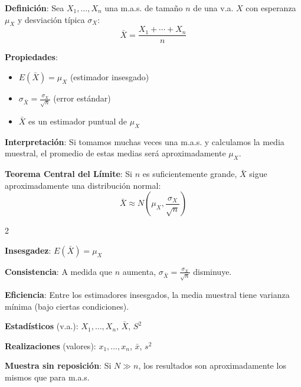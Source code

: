 \documentclass[10pt,a4paper]{article}
\begin{document}
\begin{tcolorbox}[title=Media Muestral]
    \textbf{Definición}: Sea $X_1, \ldots, X_n$ una m.a.s. de tamaño $n$ de una v.a. $X$ con esperanza $\mu_X$ y desviación típica $\sigma_X$:
    \[
        \bar{X} = \frac{X_1 + \cdots + X_n}{n}
    \]
    
    \textbf{Propiedades}:
    \begin{itemize}
        \item $E(\bar{X}) = \mu_X$ (estimador insesgado)
        \item $\sigma_{\bar{X}} = \frac{\sigma_X}{\sqrt{n}}$ (error estándar)
        \item $\bar{X}$ es un estimador puntual de $\mu_X$
    \end{itemize}
    
    \textbf{Interpretación}: Si tomamos muchas veces una m.a.s. y calculamos la media muestral, el promedio de estas medias será aproximadamente $\mu_X$.
    
    \textbf{Teorema Central del Límite}: Si $n$ es suficientemente grande, $\bar{X}$ sigue aproximadamente una distribución normal:
    \[
        \bar{X} \approx N\left(\mu_X, \frac{\sigma_X}{\sqrt{n}}\right)
    \]
\end{tcolorbox}

\begin{multicols}{2}
    \begin{tcolorbox}[title=Propiedades de la Media Muestral, equal height group=EST2]
        \textbf{Insesgadez}: $E(\bar{X}) = \mu_X$
        
        \textbf{Consistencia}: A medida que $n$ aumenta, $\sigma_{\bar{X}} = \frac{\sigma_X}{\sqrt{n}}$ disminuye.
        
        \textbf{Eficiencia}: Entre los estimadores insesgados, la media muestral tiene varianza mínima (bajo ciertas condiciones).
    \end{tcolorbox}
    \begin{tcolorbox}[title=Notación y Convenios, equal height group=EST2]
        \textbf{Estadísticos} (v.a.): $X_1, \ldots, X_n$, $\bar{X}$, $S^2$
        
        \textbf{Realizaciones} (valores): $x_1, \ldots, x_n$, $\bar{x}$, $s^2$
        
        \textbf{Muestra sin reposición}: Si $N \gg n$, los resultados son aproximadamente los mismos que para m.a.s.
    \end{tcolorbox}
\end{multicols}
\end{document}
